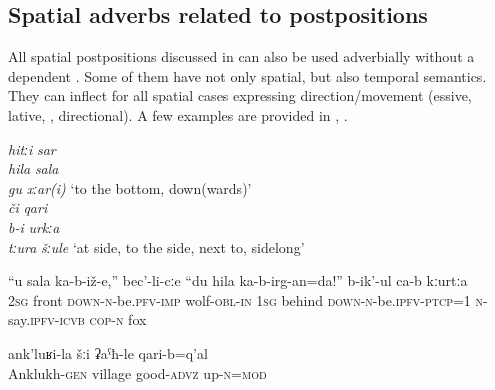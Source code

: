 
\subsection{Spatial adverbs related to postpositions}
\label{ssec:SpatialAdverbsDerivedFromPostpositions}

All spatial postpositions discussed in  can also be used adverbially without a dependent  . Some of them have not only spatial, but also temporal semantics. They can inflect for all spatial cases expressing direction\slash movement (essive, lative, , directional). A few examples are provided in , .

\begin{exe}
	\ex	\label{ex:adjectivesWithCHIB}
		\TabPositions{12em}
		\textit{hitːi} 			\tab	\textit{sar}  \\
		\textit{hila }	\tab	\textit{sala}  \\
		\textit{gu} 		\tab	\textit{xːar(i)} `to the bottom, down(wards)'\\
		\textit{či} 		\tab		\textit{qari}  \\
		\textit{b-i} 			\tab		\textit{urkːa}  \\
		\textit{tːura} 		\tab		\textit{šːule} `at side, to the side, next to, sidelong'

	\ex	\label{ex:Now the fox says to the wolf you sit down in front}
	\gll	``u	sala	ka-b-iž-e,''		bec'-li-cːe	``du	hila	ka-b-irg-an=da!''	b-ik'-ul ca-b	kːurtːa  \\ 
		2\textsc{sg}	front	\textsc{down-n}-be.\textsc{pfv}-\textsc{imp}	wolf-\textsc{obl}-\textsc{in} 1\textsc{sg} behind \textsc{down-n}-be.\textsc{ipfv}-\textsc{ptcp}=1	\textsc{n}-say.\textsc{ipfv}-\textsc{icvb} \textsc{cop-n}	fox\\
	\glt	{}

	\ex	\label{ex:The village of Anklukh is pretty high up}
	\gll	ank'luʁi-la	šːi	ʡaˁħ-le	qari-b=q'al\\
		Anklukh-\textsc{gen}	village	good-\textsc{advz}	up-\textsc{n}=\textsc{mod}\\
	\glt	{}
\end{exe}

